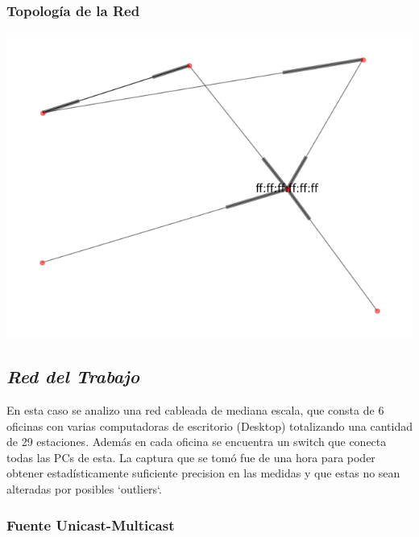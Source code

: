 \subsubsection{Topolog\'ia de la Red}
\begin{center}
 \includegraphics[scale=0.6]{../plots/mauro_s2_topologia.png}
\end{center}

\subsection{\emph{Red del Trabajo}}

En esta caso se analizo una red cableada de mediana escala, 
que consta de 6 oficinas con varias computadoras de escritorio (Desktop) totalizando
una cantidad de 29 estaciones. Además en cada oficina se encuentra un switch que conecta todas
las PCs de esta. La captura que se tomó fue de una hora para 
poder obtener estadísticamente suficiente precision en las medidas y que estas no sean
alteradas por posibles `outliers`.

\subsubsection{Fuente Unicast-Multicast}

